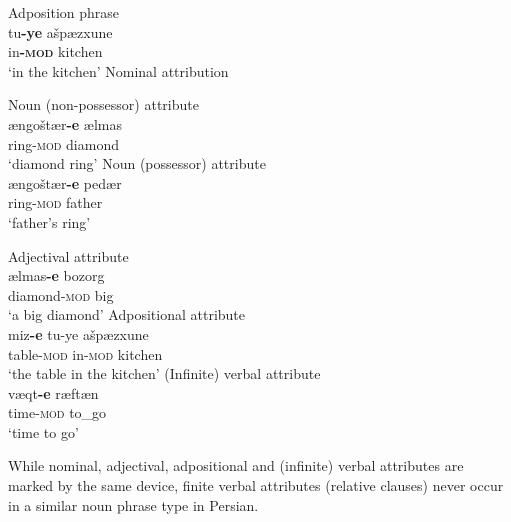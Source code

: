 \begin{exe}
\ex 
{}\label{multi persian}
\begin{xlist}
\ex \rm{Adposition phrase}\\
\gll	tu\textbf{-ye} ašpæzxune\\
	in\textbf{-\textsc{mod}} kitchen\\
\glt ‘in the kitchen’
\ex \rm{Nominal attribution}
\begin{xlist}
\ex \rm{Noun (non-possessor) attribute}\\
\gll 	ængoštær\textbf{-e} ælmas\\
	ring-\textsc{mod} diamond\\
\glt 	‘diamond ring’
\ex \rm{Noun (possessor) attribute}\\
\gll	ængoštær\textbf{-e} pedær\\
	ring-\textsc{mod} father\\
\glt	‘father's ring’
\end{xlist}
\ex \rm{Adjectival attribute}\\
\gll	ælmas\textbf{-e} bozorg\\
	diamond-\textsc{mod} big\\
\glt	‘a big diamond’
\ex \rm{Adpositional attribute}\\
\gll	miz\textbf{-e} tu{-ye} ašpæzxune\\
	table-\textsc{mod} in{-\textsc{mod}} kitchen\\
\glt ‘the table in the kitchen’
\ex \rm{(Infinite) verbal attribute}\\
\gll	væqt\textbf{-e} ræftæn\\
	time-\textsc{mod} to\_go\\
\glt	‘time to go’
\end{xlist}
\end{exe}
While nominal, adjectival, adpositional and (infinite) verbal attributes are marked by the same device, finite verbal attributes (relative clauses) never occur in a similar noun phrase type in Persian.

